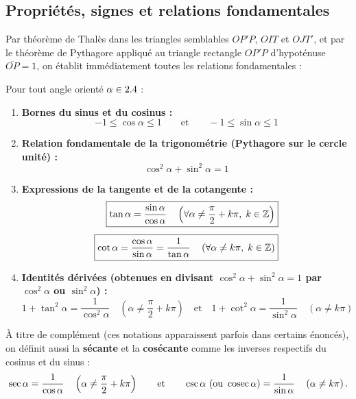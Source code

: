 \subsection{Propriétés, signes et relations fondamentales}

Par théorème de Thalès dans les triangles semblables $OP'P$, $OIT$ et $OJT'$, et par le théorème de Pythagore appliqué au triangle rectangle $OP'P$ d'hypoténuse $\overline{OP} = 1$, on établit immédiatement toutes les relations fondamentales :

\begin{theoreme}
Pour tout angle orienté $\alpha \in 2.4$ :
\begin{enumerate}
    \item \textbf{Bornes du sinus et du cosinus :}
    \[
        \boxed{-1 \le \cos\alpha \le 1 \qquad \text{et} \qquad -1 \le \sin\alpha \le 1}
    \]
    \item \textbf{Relation fondamentale de la trigonométrie (Pythagore sur le cercle unité) :}
    \[
        \boxed{\cos^2\alpha + \sin^2\alpha = 1}
    \]
    \item \textbf{Expressions de la tangente et de la cotangente :}
    \begin{align*}
        \boxed{\tan\alpha = \frac{\sin\alpha}{\cos\alpha} \quad \left(\forall \alpha \neq \frac{\pi}{2} + k\pi,\; k\in\mathbb{Z}\right)} \\[4pt]
        \boxed{\cot\alpha = \frac{\cos\alpha}{\sin\alpha} = \frac{1}{\tan\alpha} \quad \left(\forall \alpha \neq k\pi,\; k\in\mathbb{Z}\right)}
    \end{align*}
    \item \textbf{Identités dérivées (obtenues en divisant $\cos^2\alpha + \sin^2\alpha = 1$ par $\cos^2\alpha$ ou $\sin^2\alpha$) :}
    \[
        \boxed{1 + \tan^2\alpha = \frac{1}{\cos^2\alpha} \quad \left(\alpha \neq \frac{\pi}{2}+k\pi\right)}
        \quad \text{et} \quad
        \boxed{1 + \cot^2\alpha = \frac{1}{\sin^2\alpha} \quad \left(\alpha \neq k\pi\right)}
    \]
\end{enumerate}
\end{theoreme}

À titre de complément (ces notations apparaissent parfois dans certains énoncés), on définit aussi la \textbf{sécante} et la \textbf{cosécante} comme les inverses respectifs du cosinus et du sinus :
\[
    \sec\alpha = \frac{1}{\cos\alpha} \quad \left(\alpha \neq \frac{\pi}{2}+k\pi\right)
    \qquad \text{et} \qquad
    \csc\alpha \text{ (ou } \operatorname{cosec}\alpha\text{)} = \frac{1}{\sin\alpha} \quad \left(\alpha \neq k\pi\right).
\]

